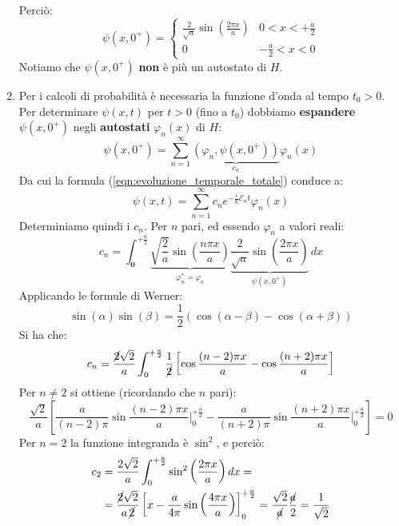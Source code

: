 \documentclass[../../FisicaTeorica.tex]{subfiles}
\begin{document}
\begin{enumerate}
\begin{align*}
\end{align*}
Perciò:
\[
\psi(x,0^+)=\begin{cases}
\frac{2}{\sqrt{a}}\sin\left(\frac{2\pi x}{a}\right) & 0<x<+\frac{a}{2}\\
0 & -\frac{a}{2}<x<0
\end{cases}
\]
Notiamo che $\psi(x,0^+)$ \textbf{non} è più un autostato di $H$.\\
\item Per i calcoli di probabilità è necessaria la funzione d'onda al tempo $t_0>0$. Per determinare $\psi(x,t)$ per $t>0$ (fino a $t_0$) dobbiamo \textbf{espandere} $\psi(x,0^+)$ negli \textbf{autostati} $\varphi_n(x)$ di $H$:
\[
\psi(x,0^+)=\sum_{n=1}^{\infty} \underbrace{(\varphi_n, \psi(x,0^+))}_{c_n}\varphi_n(x)
\]
Da cui la formula (\ref{eqn:evoluzione_temporale_totale}) conduce a:
\[
\psi(x,t)=\sum_{n=1}^\infty c_n e^{-\frac{i}{\hbar}\mathcal{E}_n t}\varphi_n(x)
\]
Determiniamo quindi i $c_n$. Per $n$ pari, ed essendo $\varphi_n$ a valori reali:
\[
c_n = \int_{\bm{0}}^{+\frac{a}{2}} \underbrace{\sqrt{\frac{2}{a}} \sin\left(\frac{n\pi x}{a}\right)}_{\varphi_n^*=\varphi_n} \underbrace{\frac{2}{\sqrt{a}}\sin\left(\frac{2\pi x}{a}\right)}_{\psi(x,0^+)}\,dx
\]
Applicando le formule di Werner:
\[
\sin(\alpha)\sin(\beta)=\frac{1}{2}\left(\cos(\alpha-\beta)-\cos(\alpha+\beta)\right)
\]
Si ha che:
\[
c_n = \frac{\cancel{2}\sqrt{2}}{a}\int_0^{+\frac{a}{2}} \frac{1}{\cancel{2}} \left[\cos \frac{(n-2)\pi x}{a}-\cos\frac{(n+2)\pi x}{a}\right]
\]
Per $n\neq 2$ si ottiene (ricordando che $n$ pari):
\[
\frac{\sqrt{2}}{a}\left[\frac{a}{(n-2)\pi}\sin\frac{(n-2)\pi x}{a}\Big|_0^{+\frac{a}{2}} - \frac{a}{(n+2)\pi}\sin\frac{(n+2)\pi x}{a}\Big|_0^{+\frac{a}{2}}\right] = 0
\]
Per $n=2$ la funzione integranda è $\sin^2$, e perciò:
\begin{align*}
c_2&=\frac{2\sqrt{2}}{a}\int_0^{+\frac{a}{2}}\sin^2\left(\frac{2\pi x}{a}\right)dx =\\
&= \frac{\cancel{2} \sqrt{2}}{a \, \cancel{2}}\left[
x-\frac{a}{4\pi}\sin\left(\frac{4\pi x}{a}\right)\right]_0^{+\frac{a}{2}} =
\frac{\sqrt{2}}{\cancel{a}}\frac{\cancel{a}}{2}=\frac{1}{\sqrt{2}}
\end{align*}


\end{enumerate}
\end{document}
